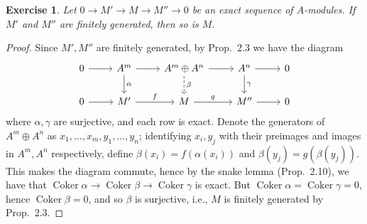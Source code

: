 \documentclass[12pt,letterpaper]{article}
\newtheorem{problem}{Exercise}[section]
\theoremstyle{definition}
\theoremstyle{remark}
\numberwithin{figure}{problem}
\numberwithin{equation}{section}
\let\Im\relax
\DeclareMathOperator{\Im}{Im}
\let\ker\relax
\DeclareMathOperator{\ker}{Ker}
\DeclareMathOperator{\Coker}{Coker}
\begin{document}
\begin{problem}
  Let $0 \to M' \to M \to M'' \to 0$ be an exact sequence of $A$-modules. If $M'$ and $M''$ are finitely generated, then so is $M$.
\end{problem}
\begin{proof}
  Since $M',M''$ are finitely generated, by Prop.~2.3 we have the diagram
  \begin{equation*}
    \begin{tikzcd}
      0 \rar & A^m \rar\dar{\alpha} & A^{m} \oplus A^n \rar\dar[dashed]{\beta} & A^n \rar\dar{\gamma} & 0\\
      0 \rar & M' \rar{f} & M \rar{g} & M'' \rar & 0
    \end{tikzcd}
  \end{equation*}
  where $\alpha,\gamma$ are surjective, and each row is exact. Denote the generators of $A^{m} \oplus A^n$ as $x_1,\ldots,x_m,y_1,\ldots,y_n$; identifying $x_i,y_j$ with their preimages and images in $A^m,A^n$ respectively, define $\beta(x_i) = f(\alpha(x_i))$ and $\beta(y_j) = g(\beta(y_j))$. This makes the diagram commute, hence by the snake lemma (Prop.~2.10), we have that $\Coker \alpha \to \Coker \beta \to \Coker \gamma$ is exact. But $\Coker \alpha = \Coker \gamma = 0$, hence $\Coker \beta = 0$, and so $\beta$ is surjective, i.e., $M$ is finitely generated by Prop.~2.3.
\end{proof}
\end{document}
